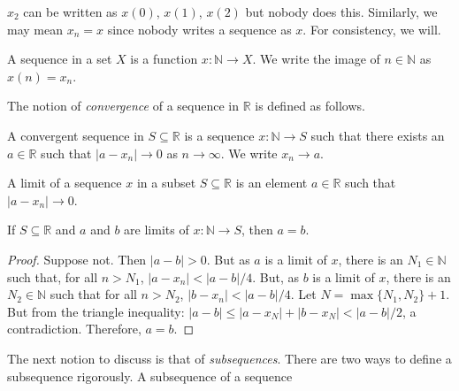             $x_{2}$ can be written as $x(0)$, $x(1)$,
            $x(2)$ but nobody does this. Similarly,
            we may mean $x_{n}=x$ since nobody writes
            a sequence as $x$. For consistency, we will.
            \begin{definition}
                A sequence in a set $X$ is a function
                $x:\mathbb{N}\rightarrow{X}$.
                We write the image of $n\in\mathbb{N}$
                as $x(n)=x_{n}$.
            \end{definition}
            The notion of \textit{convergence} of a sequence
            in $\mathbb{R}$ is defined as follows.
            \begin{definition}
                A convergent sequence in $S\subseteq\mathbb{R}$
                is a sequence $x:\mathbb{N}\rightarrow{S}$
                such that there exists an $a\in\mathbb{R}$
                such that $|a-x_{n}|\rightarrow{0}$ as
                $n\rightarrow\infty$. We write
                $x_{n}\rightarrow{a}$.
            \end{definition}
            \begin{definition}
                A limit of a sequence $x$
                in a subset $S\subseteq\mathbb{R}$ is an
                element $a\in\mathbb{R}$ such that
                $|a-x_{n}|\rightarrow{0}$.
            \end{definition}
            \begin{theorem}
                If $S\subseteq\mathbb{R}$ and $a$ and $b$ are
                limits of $x:\mathbb{N}\rightarrow{S}$,
                then $a=b$.
            \end{theorem}
            \begin{proof}
                Suppose not. Then $|a-b|>0$. But as $a$ is a
                limit of $x$, there is an $N_{1}\in\mathbb{N}$
                such that, for all $n>N_{1}$,
                $|a-x_{n}|<|a-b|/4$. But, as $b$ is a limit
                of $x$, there is an $N_{2}\in\mathbb{N}$
                such that for all $n>N_{2}$,
                $|b-x_{n}|<|a-b|/4$. Let $N=\max\{N_{1},N_{2}\}+1$.
                But from the triangle inequality:
                $|a-b|\leq|a-x_{N}|+|b-x_{N}|<|a-b|/2$, a
                contradiction. Therefore, $a=b$.
            \end{proof}
            The next notion to discuss is that of
            \textit{subsequences}. There are two ways to define
            a subsequence rigorously. A subsequence of a sequence
